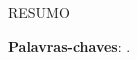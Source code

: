 % 
%
%
%		
%	
%








\begin{resumo}
    RESUMO

    \vspace{\onelineskip}
    
    \noindent
    \textbf{Palavras-chaves}: .
\end{resumo}


